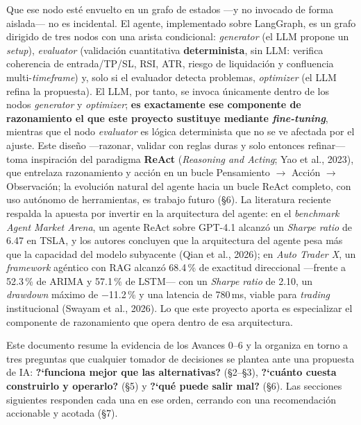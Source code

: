 \documentclass[11pt]{article}
\begin{document}
Que ese nodo est\'e envuelto en un grafo de estados ---y no invocado de forma aislada--- no es incidental. El agente, implementado sobre LangGraph, es un grafo dirigido de tres nodos con una arista condicional: \textit{generator} (el LLM propone un \textit{setup}), \textit{evaluator} (validaci\'on cuantitativa \textbf{determinista}, sin LLM: verifica coherencia de entrada/TP/SL, RSI, ATR, riesgo de liquidaci\'on y confluencia multi-\textit{timeframe}) y, solo si el evaluador detecta problemas, \textit{optimizer} (el LLM refina la propuesta). El LLM, por tanto, se invoca \'unicamente dentro de los nodos \textit{generator} y \textit{optimizer}; \textbf{es exactamente ese componente de razonamiento el que este proyecto sustituye mediante \textit{fine-tuning}}, mientras que el nodo \textit{evaluator} es l\'ogica determinista que no se ve afectada por el ajuste. Este dise\~no ---razonar, validar con reglas duras y solo entonces refinar--- toma inspiraci\'on del paradigma \textbf{ReAct} (\textit{Reasoning and Acting}; Yao et al., 2023), que entrelaza razonamiento y acci\'on en un bucle Pensamiento $\rightarrow$ Acci\'on $\rightarrow$ Observaci\'on; la evoluci\'on natural del agente hacia un bucle ReAct completo, con uso aut\'onomo de herramientas, es trabajo futuro (\S6). La literatura reciente respalda la apuesta por invertir en la arquitectura del agente: en el \textit{benchmark} \textit{Agent Market Arena}, un agente ReAct sobre GPT-4.1 alcanz\'o un \textit{Sharpe ratio} de 6.47 en TSLA, y los autores concluyen que la arquitectura del agente pesa m\'as que la capacidad del modelo subyacente (Qian et al., 2026); en \textit{Auto Trader X}, un \textit{framework} ag\'entico con RAG alcanz\'o 68.4\,\% de exactitud direccional ---frente a 52.3\,\% de ARIMA y 57.1\,\% de LSTM--- con un \textit{Sharpe ratio} de 2.10, un \textit{drawdown} m\'aximo de $-$11.2\,\% y una latencia de 780\,ms, viable para \textit{trading} institucional (Swayam et al., 2026). Lo que este proyecto aporta es especializar el componente de razonamiento que opera dentro de esa arquitectura.

Este documento resume la evidencia de los Avances 0--6 y la organiza en torno a tres preguntas que cualquier tomador de decisiones se plantea ante una propuesta de IA: \textbf{?`funciona mejor que las alternativas?} (\S2--\S3), \textbf{?`cu\'anto cuesta construirlo y operarlo?} (\S5) y \textbf{?`qu\'e puede salir mal?} (\S6). Las secciones siguientes responden cada una en ese orden, cerrando con una recomendaci\'on accionable y acotada (\S7).
\end{document}
